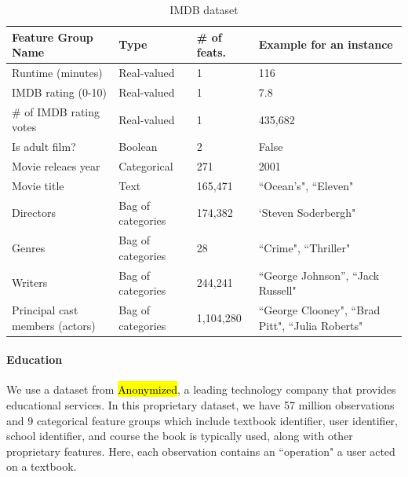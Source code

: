 \documentclass{article} %
\begin{document}
\begin{table}[htb]
\footnotesize
\centering
\caption{IMDB dataset}
\label{tab:features}
\begin{tabular}{@{}lllp{6cm}@{}}
\toprule
Feature Group Name      & Type              & \# of feats. & Example for an instance                                      \\ \midrule
Runtime (minutes)       & Real-valued       & 1                 & 116                                                           \\
IMDB rating (0-10)      & Real-valued       & 1                 & 7.8                                                          \\
\# of IMDB rating votes & Real-valued       & 1                 & 435,682                                                          \\
Is adult film?          & Boolean           & 2                 & False                                                        \\
Movie releaes year      & Categorical          & 271               & 2001                                                         \\
Movie title             & Text      & 165,471           & ``Ocean's", ``Eleven"                                  \\
Directors               & Bag of categories & 174,382           & `Steven Soderbergh"                                     \\
Genres                  & Bag of categories & 28                &``Crime", ``Thriller"                                 \\
Writers                 & Bag of categories & 244,241           &``George Johnson'', ``Jack Russell"                      \\
Principal cast members (actors) & Bag of categories & 1,104,280         & ``George Clooney", ``Brad Pitt", ``Julia Roberts" \\\bottomrule
\end{tabular}
\end{table}

\paragraph{Education}
We use a dataset from \hl{Anonymized}, a leading technology company that provides educational services.
In this proprietary dataset, we have 57  million observations and 9 categorical feature groups which include textbook identifier, user identifier, school identifier, and course the book is typically used, along with other proprietary features.
Here, each observation contains an ``operation" a user acted on a textbook.
\end{document}
